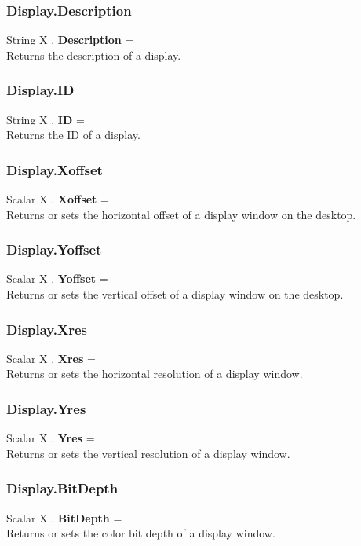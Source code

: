 \documentclass[10pt]{book}
\begin{document}
\subsubsection{Display.Description \label{F:Display:Description}}
String X . \textbf{Description} = \\
Returns the description of a display.

\subsubsection{Display.ID \label{F:Display:ID}}
String X . \textbf{ID} = \\
Returns the ID of a display.

\subsubsection{Display.Xoffset \label{F:Display:Xoffset}}
Scalar X . \textbf{Xoffset} = \\
Returns or sets the horizontal offset of a display window on the desktop.

\subsubsection{Display.Yoffset \label{F:Display:Yoffset}}
Scalar X . \textbf{Yoffset} = \\
Returns or sets the vertical offset of a display window on the desktop.


\subsubsection{Display.Xres \label{F:Display:Xres}}
Scalar X . \textbf{Xres} = \\
Returns or sets the horizontal resolution of a display window.


\subsubsection{Display.Yres \label{F:Display:Yres}}
Scalar X . \textbf{Yres} = \\
Returns or sets the vertical resolution of a display window.


\subsubsection{Display.BitDepth \label{F:Display:BitDepth}}
Scalar X . \textbf{BitDepth} = \\
Returns or sets the color bit depth of a display window.
\end{document}
